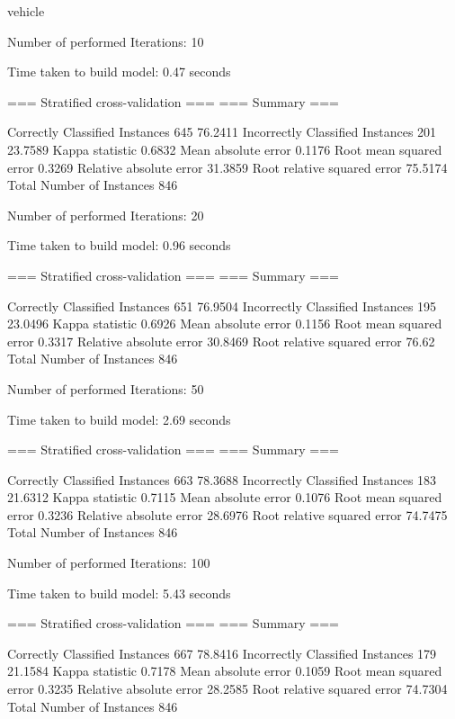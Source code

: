 vehicle

Number of performed Iterations: 10


Time taken to build model: 0.47 seconds

=== Stratified cross-validation ===
=== Summary ===

Correctly Classified Instances         645               76.2411 %
Incorrectly Classified Instances       201               23.7589 %
Kappa statistic                          0.6832
Mean absolute error                      0.1176
Root mean squared error                  0.3269
Relative absolute error                 31.3859 %
Root relative squared error             75.5174 %
Total Number of Instances              846     

Number of performed Iterations: 20


Time taken to build model: 0.96 seconds

=== Stratified cross-validation ===
=== Summary ===

Correctly Classified Instances         651               76.9504 %
Incorrectly Classified Instances       195               23.0496 %
Kappa statistic                          0.6926
Mean absolute error                      0.1156
Root mean squared error                  0.3317
Relative absolute error                 30.8469 %
Root relative squared error             76.62   %
Total Number of Instances              846     

Number of performed Iterations: 50


Time taken to build model: 2.69 seconds

=== Stratified cross-validation ===
=== Summary ===

Correctly Classified Instances         663               78.3688 %
Incorrectly Classified Instances       183               21.6312 %
Kappa statistic                          0.7115
Mean absolute error                      0.1076
Root mean squared error                  0.3236
Relative absolute error                 28.6976 %
Root relative squared error             74.7475 %
Total Number of Instances              846     

Number of performed Iterations: 100


Time taken to build model: 5.43 seconds

=== Stratified cross-validation ===
=== Summary ===

Correctly Classified Instances         667               78.8416 %
Incorrectly Classified Instances       179               21.1584 %
Kappa statistic                          0.7178
Mean absolute error                      0.1059
Root mean squared error                  0.3235
Relative absolute error                 28.2585 %
Root relative squared error             74.7304 %
Total Number of Instances              846


